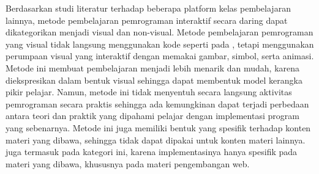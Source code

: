 


Berdasarkan studi literatur terhadap beberapa platform kelas pembelajaran lainnya, metode pembelajaran pemrograman interaktif secara daring dapat dikategorikan menjadi visual dan non-visual. Metode pembelajaran pemrograman yang visual tidak langsung menggunakan kode seperti pada \textcite{brilliant2021media}, tetapi menggunakan perumpaan visual yang interaktif dengan memakai gambar, simbol, serta animasi. Metode ini membuat pembelajaran menjadi lebih menarik dan mudah, karena diekspresikan dalam bentuk visual sehingga dapat membentuk model kerangka pikir pelajar. Namun, metode ini tidak menyentuh secara langsung aktivitas pemrograman secara praktis sehingga ada kemungkinan dapat terjadi perbedaan antara teori dan praktik yang dipahami pelajar dengan implementasi program yang sebenarnya. Metode ini juga memiliki bentuk yang spesifik terhadap konten materi yang dibawa, sehingga tidak dapat dipakai untuk konten materi lainnya. \textcite{froggy2021media} juga termasuk pada kategori ini, karena implementasinya hanya spesifik pada materi yang dibawa, khususnya pada materi pengembangan web.

